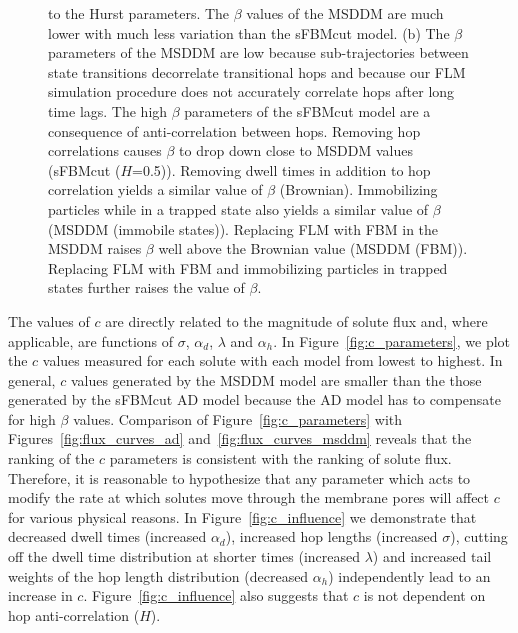 \documentclass{article}
\begin{document}
\begin{figure}
{  to the Hurst parameters. The $\beta$ values of the MSDDM are much lower with much less
  variation than the sFBMcut model. (b) The $\beta$ parameters of the MSDDM are low because
  sub-trajectories between state transitions decorrelate transitional hops and because
  our FLM simulation procedure does not accurately correlate hops after long time lags. 
  The high $\beta$ parameters of the sFBMcut model are a consequence of anti-correlation
  between hops. Removing hop correlations causes $\beta$ to drop down close to MSDDM
  values (sFBMcut ($H$=0.5)). Removing dwell times in addition to hop correlation
  yields a similar value of $\beta$ (Brownian). Immobilizing particles while in a trapped state
  also yields a similar value of $\beta$ (MSDDM (immobile states)). Replacing FLM with
  FBM in the MSDDM raises $\beta$ well above the Brownian value (MSDDM (FBM)). Replacing FLM with FBM and
  immobilizing particles in trapped states further raises the value of $\beta$.}\label{fig:beta}
  \end{figure}
  
  The values of $c$ are directly related to the magnitude of solute flux and, where
  applicable, are functions of $\sigma$, $\alpha_d$, $\lambda$ and $\alpha_h$. 
  In Figure~\ref{fig:c_parameters}, we plot the $c$ values measured
  for each solute with each model from lowest to highest. In general, $c$ values generated
  by the MSDDM model are smaller than the those generated by the sFBMcut AD model 
  because the AD model has to compensate for high $\beta$ values. Comparison 
  of Figure~\ref{fig:c_parameters} with Figures~\ref{fig:flux_curves_ad} 
  and~\ref{fig:flux_curves_msddm} reveals that the ranking of the $c$ parameters is
  consistent with the ranking of solute flux. Therefore, it is reasonable to hypothesize
  that any parameter which acts to modify the rate at which solutes move through the
  membrane pores will affect $c$ for various physical reasons. In 
  Figure~\ref{fig:c_influence} we demonstrate that decreased dwell times
  (increased $\alpha_d$), increased hop lengths (increased $\sigma$), cutting off the
  dwell time distribution at shorter times (increased $\lambda$) and increased tail 
  weights of the hop length distribution (decreased $\alpha_h$) independently lead to
  an increase in $c$. Figure~\ref{fig:c_influence} also suggests that $c$ is not dependent on hop
  anti-correlation ($H$).

  
\end{document}
